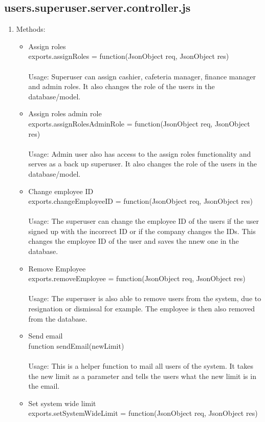 \documentclass[a4paper,12pt]{article}
\begin{document}
\subsection{users.superuser.server.controller.js}
\begin{enumerate}
\item Methods:
	\begin{itemize}
		\item Assign roles \\ exports.assignRoles = function(JsonObject req, JsonObject res) 
		\\ \\ Usage: Superuser can assign cashier, cafeteria manager, finance manager and admin roles. It also changes the role of the users in the database/model. 
		\item Assign roles admin role \\ exports.assignRolesAdminRole = function(JsonObject req, JsonObject res) 
		\\ \\ Usage: Admin user also has access to the assign roles functionality and serves as a back up superuser. It also changes the role of the users in the database/model.
		\item Change employee ID \\ exports.changeEmployeeID = function(JsonObject req, JsonObject res)  
		\\ \\ Usage: The superuser can change the employee ID of the users if the user signed up with the incorrect ID or if the company changes the IDs. This changes the employee ID of the user and saves the nnew one in the database.
		\item Remove Employee \\ exports.removeEmployee = function(JsonObject req, JsonObject res)  
		\\ \\ Usage: The superuser is also able to remove users from the system, due to resignation or dismissal for example. The employee is then also removed from the database.	
		\item Send email \\ function sendEmail(newLimit)  
		\\ \\ Usage: This is a helper function to mail all users of the system. It takes the new limit as a parameter and tells the users what the new limit is in the email.
		\item Set system wide limit \\ exports.setSystemWideLimit = function(JsonObject req, JsonObject res) 

\end{itemize}
\end{enumerate}
\end{document}
